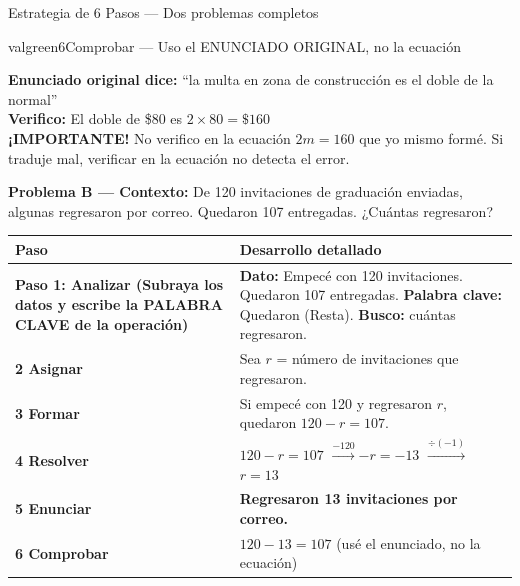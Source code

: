 \documentclass[12pt, letterpaper]{article}
\begin{document}
\begin{ejemploresuelto}{Estrategia de 6 Pasos — Dos problemas completos}
		\begin{pasocaja}{valgreen}{6}{Comprobar — Uso el ENUNCIADO ORIGINAL, no la ecuación}
			\begin{tcolorbox}[enhanced,colback=valgreen!5,colframe=valgreen,arc=2pt,boxrule=0.8pt]
				\textbf{Enunciado original dice:} ``la multa en zona de construcción es el doble de la normal''\\
				\textbf{Verifico:} El doble de \$80 es $2 \times 80 = \$160$ \textcolor{valgreen}{\checkmark}\\[4pt]
				\textcolor{valred}{\textbf{¡IMPORTANTE!}} No verifico en la ecuación $2m=160$
				que yo mismo formé. Si traduje mal, verificar en la ecuación no detecta el error.
			\end{tcolorbox}
		\end{pasocaja}
		
		\textbf{Problema B — Contexto:} De 120 invitaciones de graduación enviadas,
		algunas regresaron por correo. Quedaron 107 entregadas. ¿Cuántas regresaron?
		
		\begin{center}
			\renewcommand{\arraystretch}{1.8}
			\begin{tabular}{|m{5.5cm}|m{7.8cm}|}
				\hline
				\rowcolor{valblue!15}
				\textbf{Paso} & \textbf{Desarrollo detallado} \\
				\hline
				\textcolor{valblue}{\textbf{Paso 1: Analizar (Subraya los datos y escribe la PALABRA CLAVE de la operación)}} &
				\textbf{Dato:} Empecé con 120 invitaciones. Quedaron 107 entregadas. \textbf{Palabra clave:} Quedaron (Resta). \textbf{Busco:} cuántas regresaron. \\
				\hline
				\textcolor{valgreen}{\textbf{2 Asignar}} &
				Sea $r$ = número de invitaciones que regresaron. \\
				\hline
				\textcolor{valorange}{\textbf{3 Formar}} &
				Si empecé con 120 y regresaron $r$, quedaron $120 - r = 107$. \\
				\hline
				\textcolor{valred}{\textbf{4 Resolver}} &
				$120 - r = 107$\;\;
				$\xrightarrow{-120}$\;\;$-r = -13$\;\;
				$\xrightarrow{\div(-1)}$\;\;$r = 13$ \\
				\hline
				\textcolor{valblue}{\textbf{5 Enunciar}} &
				\textbf{Regresaron 13 invitaciones por correo.} \\
				\hline
				\rowcolor{valgreen!8}
				\textcolor{valgreen}{\textbf{6 Comprobar}} &
				$120 - 13 = 107$ \;\textcolor{valgreen}{\checkmark}
				(usé el enunciado, no la ecuación) \\
				\hline
			\end{tabular}
		\end{center}
	\end{ejemploresuelto}
	
\end{document}
